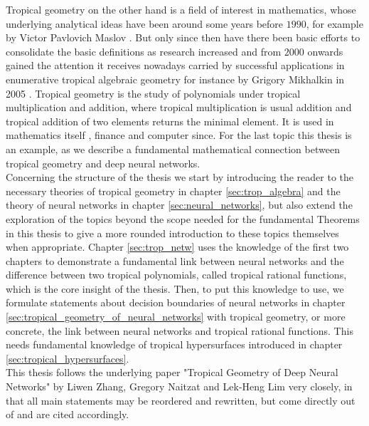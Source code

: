 \documentclass{article}
\theoremstyle{definition}
\begin{document}
Tropical geometry on the other hand is a field of interest in mathematics, whose underlying analytical ideas have been around some years before $1990$, for example by Victor Pavlovich Maslov \cite{maslov1985new}. But only since then have there been basic efforts to consolidate the basic definitions as research increased and from $2000$ onwards gained the attention it receives nowadays carried by successful applications in enumerative tropical algebraic geometry for instance by Grigory Mikhalkin in 2005 \cite{mikhalkin2005enumerative}. 
Tropical geometry is the study of polynomials under tropical multiplication and addition, where tropical multiplication is usual addition and tropical addition of two elements returns the minimal element. It is used in mathematics itself \cite{krivulin2014tropical}, finance \cite{klemperer2009new} and computer since. For the last topic this thesis is an example, as we describe a fundamental mathematical connection between tropical geometry and deep neural networks. \\

Concerning the structure of the thesis we start by introducing the reader to the necessary theories of tropical geometry in chapter \ref{sec:trop_algebra} and the theory of neural networks in chapter \ref{sec:neural_networks}, but also extend the exploration of the topics beyond the scope needed for the fundamental Theorems in this thesis to give a more rounded introduction to these topics themselves when appropriate. Chapter \ref{sec:trop_netw} uses the knowledge of the first two chapters to demonstrate a fundamental link between neural networks and the difference between two tropical polynomials, called tropical rational functions, which is the core insight of the thesis.
Then, to put this knowledge to use, we formulate statements about decision boundaries of neural networks in chapter \ref{sec:tropical_geometry_of_neural_networks} with tropical geometry, or more concrete, the link between neural networks and tropical rational functions. This needs fundamental 	knowledge of tropical hypersurfaces introduced in chapter \ref{sec:tropical_hypersurfaces}. \\

This thesis follows the underlying paper "Tropical Geometry of Deep Neural Networks" by Liwen Zhang, Gregory Naitzat and Lek-Heng Lim very closely, in that all main statements may be reordered and rewritten, but come directly out of \cite{maclagan2015introduction} and are cited accordingly.

\newpage
\end{document}
